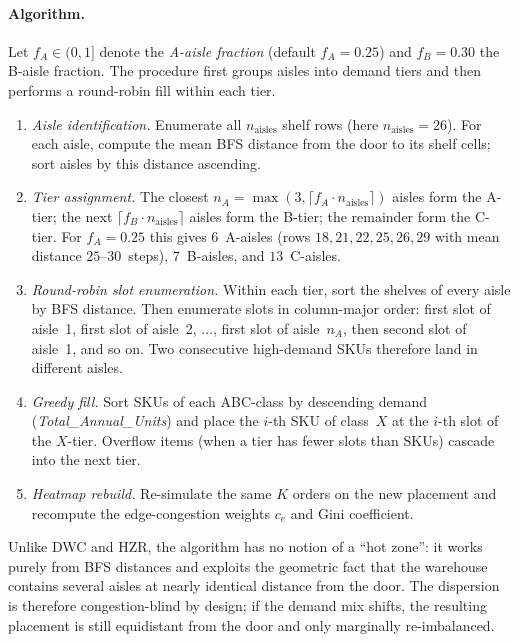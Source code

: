 \documentclass[12pt,a4paper]{article}
\begin{document}
\paragraph{Algorithm.}
Let $f_A \in (0,1]$ denote the \emph{A-aisle fraction} (default $f_A = 0.25$) and
$f_B = 0.30$ the B-aisle fraction.
The procedure first groups aisles into demand tiers and then performs a
round-robin fill within each tier.
\begin{enumerate}
  \item \emph{Aisle identification.}
        Enumerate all $n_\text{aisles}$ shelf rows (here $n_\text{aisles} = 26$).
        For each aisle, compute the mean BFS distance from the door to its shelf
        cells; sort aisles by this distance ascending.
  \item \emph{Tier assignment.}
        The closest $n_A = \max(3, \lceil f_A \cdot n_\text{aisles} \rceil)$ aisles
        form the A-tier; the next $\lceil f_B \cdot n_\text{aisles} \rceil$ aisles
        form the B-tier; the remainder form the C-tier.
        For $f_A = 0.25$ this gives $6$~A-aisles (rows $18, 21, 22, 25, 26, 29$
        with mean distance $25$--$30$~steps), $7$~B-aisles, and $13$~C-aisles.
  \item \emph{Round-robin slot enumeration.}
        Within each tier, sort the shelves of every aisle by BFS distance.
        Then enumerate slots in column-major order:
        first slot of aisle~1, first slot of aisle~2, $\ldots$,
        first slot of aisle~$n_A$, then second slot of aisle~1, and so on.
        Two consecutive high-demand SKUs therefore land in different aisles.
  \item \emph{Greedy fill.}
        Sort SKUs of each ABC-class by descending demand
        (\textit{Total\_Annual\_Units}) and place the $i$-th SKU of class~$X$
        at the $i$-th slot of the $X$-tier.
        Overflow items (when a tier has fewer slots than SKUs) cascade into the
        next tier.
  \item \emph{Heatmap rebuild.}
        Re-simulate the same $K$ orders on the new placement and recompute
        the edge-congestion weights $c_e$ and Gini coefficient.
\end{enumerate}
Unlike DWC and HZR, the algorithm has no notion of a ``hot zone'': it works purely
from BFS distances and exploits the geometric fact that the warehouse contains
several aisles at nearly identical distance from the door.
The dispersion is therefore congestion-blind by design; if the demand mix shifts,
the resulting placement is still equidistant from the door and only marginally
re-imbalanced.
\end{document}
